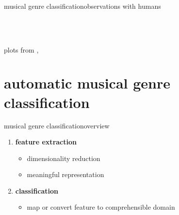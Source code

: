 \begin{frame}{musical genre classification}{observations with humans}
\begin{columns}
\begin{figure}
{                            }
                    \end{figure}
            \end{columns}
            \begin{flushright}plots from ,\end{flushright}
        \end{frame}
    
    \section[MGC]{automatic musical genre classification}

        \begin{frame}{musical genre classification}{overview}
            \begin{figure}
                
            \end{figure}
            \begin{enumerate}
                    \item	\textbf{feature extraction}
                            \begin{itemize}
                                \item 	dimensionality reduction
                                \item	meaningful representation
                            \end{itemize}
                    \bigskip
                    \item<2->	\textbf{classification}
                            \begin{itemize}
                                \item	map or convert feature to comprehensible domain
                            \end{itemize}
            \end{enumerate}
        \end{frame}

